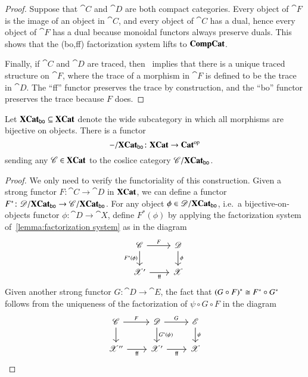 \documentclass[12pt,oneside,article,draft]{memoir}
\begin{document}
\begin{proof}
Suppose that $\cat{C}$ and $\cat{D}$ are both compact categories. Every object of $\cat{F}$ is the image of an object in $\cat{C}$, and every object of $\cat{C}$ has a dual, hence every object of $\cat{F}$ has a dual because monoidal functors always preserve duals. This shows that the (bo,ff) factorization system lifts to $\mathbf{CompCat}$.

Finally, if $\cat{C}$ and $\cat{D}$ are traced, then~\cite[Proposition 2.4]{JoyalStreetVertity} implies that there is a unique traced structure on $\cat{F}$, where the trace of a morphism in $\cat{F}$ is defined to be the trace in $\cat{D}$. The ``ff'' functor preserves the trace by construction, and the ``bo'' functor preserves the trace because $F$ does.
\end{proof}

\begin{proposition}\label{prop:coslice Xbo}
  Let $\mathbf{XCat}_{\mathsf{bo}}\subseteq\mathbf{XCat}$ denote the wide subcategory in which all morphisms are bijective on objects.
 There is a functor 
  $$-/\mathbf{XCat}_{\mathsf{bo}}\colon\mathbf{XCat}\to{\mathbf{Cat}}^{\text{op}}$$
  sending any $\mathscr{C}\in\mathbf{XCat}$ to the coslice category $\mathscr{C}/\mathbf{XCat}_{\mathsf{bo}}$.
  \end{proposition}
\begin{proof}
  We only need to verify the functoriality of this construction. Given a strong functor $F\colon\cat{C}\to\cat{D}$ in $\mathbf{XCat}$, we can define a functor $F^*\colon\mathscr{D}/\mathbf{XCat}_{\mathsf{bo}}\to\mathscr{C}/\mathbf{XCat}_{\mathsf{bo}}$. For any object $\phi\in\mathscr{D}/\mathbf{XCat}_{\mathsf{bo}}$, i.e.~a bijective-on-objects functor $\phi\colon\cat{D}\to\cat{X}$, define $F^*(\phi)$ by applying the factorization system of~\ref{lemma:factorization system} as in the diagram
  \[
  \begin{tikzcd}
    \cat{C} \ar[r,"F"] \ar[d,"F^*(\phi)"'] & \cat{D} \ar[d,"\phi"] \\
    \cat{X}' \ar[r,"\ff"'] & \cat{X}
  \end{tikzcd}
  \]
  Given another strong functor $G\colon\cat{D}\to\cat{E}$, the fact that ${(G\circ F)}^*\cong F^*\circ G^*$ follows from the uniqueness of the factorization of $\psi\circ G\circ F$ in the diagram
  \[
  \begin{tikzcd}
    \cat{C} \ar[r,"F"] \ar[d] 
      & \cat{D} \ar[r,"G"] \ar[d,"G^*(\psi)"] 
      & \cat{E} \ar[d,"\psi"] \\
    \cat{X}'' \ar[r,"\ff"'] & \cat{X}' \ar[r,"\ff"'] & \cat{X}
  \end{tikzcd}
  \]
\end{proof}
\end{document}
